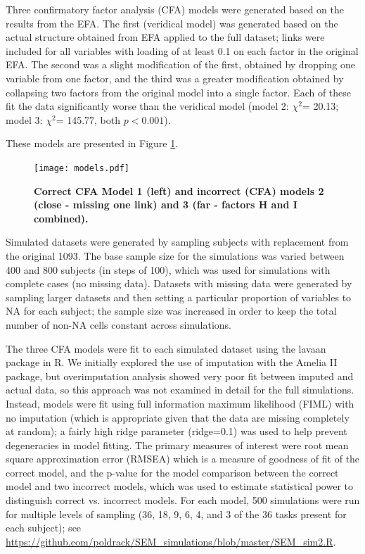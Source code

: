 \documentclass[11pt, oneside]{article}   	%
\begin{document}
Three confirmatory factor analysis (CFA) models were generated based on the results from the EFA.  The first (veridical model) was generated based on the actual structure obtained from EFA applied to the full dataset; links were included for all variables with loading of at least 0.1 on each factor in the original EFA.  The second was a slight modification of the first, obtained by dropping one variable from one factor, and the third was a greater modification obtained by collapsing two factors from the original model into a single factor.  Each of these fit the data significantly worse than the veridical model (model 2: $\chi^2$= 20.13; model 3: $\chi^2$= 145.77, both $p<0.001$).


These models are presented in Figure \ref{fig:models}.

\begin{figure}[!h]
\caption{\textbf{Correct CFA Model 1 (left) and incorrect (CFA) models 2 (close - missing one link) and 3 (far - factors H and I combined).}}
\centering
\texttt{[image: models.pdf]}
\label{fig:models}
\end{figure}

Simulated datasets were generated by sampling subjects with replacement from the original 1093.  The base sample size for the simulations was varied between 400 and 800 subjects (in steps of 100), which was used for simulations with complete cases (no missing data).  Datasets with missing data were generated by sampling larger datasets and then setting a particular proportion of variables to NA for each subject; the sample size was increased in order to keep the total number of non-NA cells constant across simulations.  

The three CFA models were fit to each simulated dataset using the lavaan package in R. We initially explored the use of imputation with the Amelia II package, but overimputation analysis showed very poor fit between imputed and actual data, so this approach was not examined in detail for the full simulations.  Instead, models were fit using full information maximum likelihood (FIML) with no imputation (which is appropriate given that the data are missing completely at random); a fairly high ridge parameter (ridge=0.1) was used to help prevent degeneracies in model fitting.  The primary measures of interest were root mean square approximation error (RMSEA) which is a measure of goodness of fit of the correct model, and the p-value for the model comparison between the correct model and two incorrect models, which was used to estimate statistical power to distinguish correct vs. incorrect models.  For each model, 500 simulations were run for multiple levels of sampling (36, 18, 9, 6, 4, and 3 of the 36 tasks present for each subject); see \url{https://github.com/poldrack/SEM_simulations/blob/master/SEM_sim2.R}.
\end{document}
